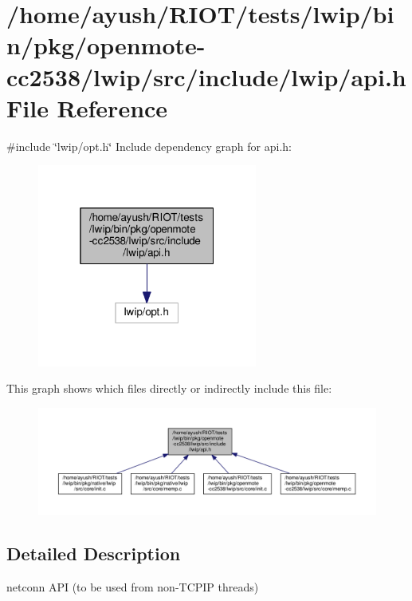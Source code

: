 \hypertarget{openmote-cc2538_2lwip_2src_2include_2lwip_2api_8h}{}\section{/home/ayush/\+R\+I\+O\+T/tests/lwip/bin/pkg/openmote-\/cc2538/lwip/src/include/lwip/api.h File Reference}
\label{openmote-cc2538_2lwip_2src_2include_2lwip_2api_8h}
{\ttfamily \#include \char`\"{}lwip/opt.\+h\char`\"{}}\newline
Include dependency graph for api.\+h\+:
\nopagebreak
\begin{figure}[H]
\begin{center}
\leavevmode
\includegraphics[width=205pt]{openmote-cc2538_2lwip_2src_2include_2lwip_2api_8h__incl}
\end{center}
\end{figure}
This graph shows which files directly or indirectly include this file\+:
\nopagebreak
\begin{figure}[H]
\begin{center}
\leavevmode
\includegraphics[width=350pt]{openmote-cc2538_2lwip_2src_2include_2lwip_2api_8h__dep__incl}
\end{center}
\end{figure}


\subsection{Detailed Description}
netconn A\+PI (to be used from non-\/\+T\+C\+P\+IP threads) 